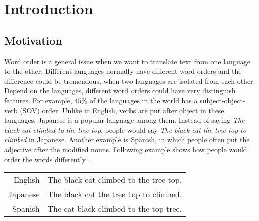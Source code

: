 
\chapter{Introduction}
\label{ch:Introduction}

\section{Motivation}
\label{ch:Introduction:sec:Motivation}

Word order is a general issue when we want to translate text from one language to the other. Different languages normally have different word orders and the difference could be tremendous, when two languages are isolated from each other. Depend on the languages, different word orders could have very distinguish features. For example, $45\%$ of the languages in the world has a subject-object-verb (SOV) order. Unlike in English, verbs are put after object in these languages. Japanese is a popular language among them. Instead of saying \emph{The black cat climbed to the tree top}, people would say \emph{The black cat the tree top to climbed} in Japanese. Another example is Spanish, in which people often put the adjective after the modified nouns. Following example shows how people would order the words differently \citep{google}.


\begin{center}
\begin{tabular}{ r l }
English & The black cat climbed to the tree top. \\
Japanese & The black cat the tree top to climbed. \\
Spanish & The cat black climbed to the top tree. \\
\end{tabular}
\end{center}

